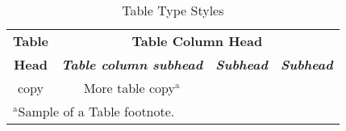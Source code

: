 \documentclass[conference]{IEEEtran}
\begin{document}
\begin{table}[htbp]
\caption{Table Type Styles}
\begin{center}
\begin{tabular}{|c|c|c|c|}
\hline
\textbf{Table}&\multicolumn{3}{|c|}{\textbf{Table Column Head}} \\
\cline{2-4} 
\textbf{Head} & \textbf{\textit{Table column subhead}}& \textbf{\textit{Subhead}}& \textbf{\textit{Subhead}} \\
\hline
copy& More table copy$^{\mathrm{a}}$& &  \\
\hline
\multicolumn{4}{l}{$^{\mathrm{a}}$Sample of a Table footnote.}
\end{tabular}
\label{tab1}
\end{center}
\end{table}




\vspace{12pt}
\end{document}
